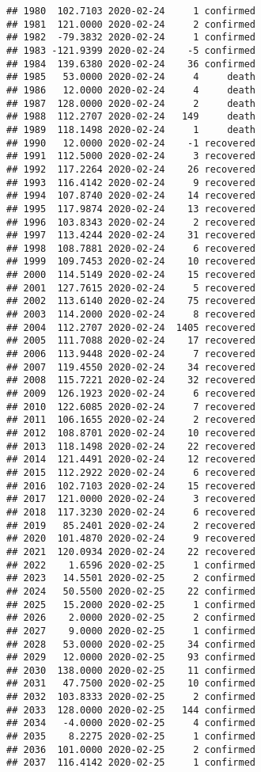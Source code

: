\documentclass[
]{article}
\begin{document}
\begin{verbatim}
## 1980  102.7103 2020-02-24     1 confirmed
## 1981  121.0000 2020-02-24     2 confirmed
## 1982  -79.3832 2020-02-24     1 confirmed
## 1983 -121.9399 2020-02-24    -5 confirmed
## 1984  139.6380 2020-02-24    36 confirmed
## 1985   53.0000 2020-02-24     4     death
## 1986   12.0000 2020-02-24     4     death
## 1987  128.0000 2020-02-24     2     death
## 1988  112.2707 2020-02-24   149     death
## 1989  118.1498 2020-02-24     1     death
## 1990   12.0000 2020-02-24    -1 recovered
## 1991  112.5000 2020-02-24     3 recovered
## 1992  117.2264 2020-02-24    26 recovered
## 1993  116.4142 2020-02-24     9 recovered
## 1994  107.8740 2020-02-24    14 recovered
## 1995  117.9874 2020-02-24    13 recovered
## 1996  103.8343 2020-02-24     2 recovered
## 1997  113.4244 2020-02-24    31 recovered
## 1998  108.7881 2020-02-24     6 recovered
## 1999  109.7453 2020-02-24    10 recovered
## 2000  114.5149 2020-02-24    15 recovered
## 2001  127.7615 2020-02-24     5 recovered
## 2002  113.6140 2020-02-24    75 recovered
## 2003  114.2000 2020-02-24     8 recovered
## 2004  112.2707 2020-02-24  1405 recovered
## 2005  111.7088 2020-02-24    17 recovered
## 2006  113.9448 2020-02-24     7 recovered
## 2007  119.4550 2020-02-24    34 recovered
## 2008  115.7221 2020-02-24    32 recovered
## 2009  126.1923 2020-02-24     6 recovered
## 2010  122.6085 2020-02-24     7 recovered
## 2011  106.1655 2020-02-24     2 recovered
## 2012  108.8701 2020-02-24    10 recovered
## 2013  118.1498 2020-02-24    22 recovered
## 2014  121.4491 2020-02-24    12 recovered
## 2015  112.2922 2020-02-24     6 recovered
## 2016  102.7103 2020-02-24    15 recovered
## 2017  121.0000 2020-02-24     3 recovered
## 2018  117.3230 2020-02-24     6 recovered
## 2019   85.2401 2020-02-24     2 recovered
## 2020  101.4870 2020-02-24     9 recovered
## 2021  120.0934 2020-02-24    22 recovered
## 2022    1.6596 2020-02-25     1 confirmed
## 2023   14.5501 2020-02-25     2 confirmed
## 2024   50.5500 2020-02-25    22 confirmed
## 2025   15.2000 2020-02-25     1 confirmed
## 2026    2.0000 2020-02-25     2 confirmed
## 2027    9.0000 2020-02-25     1 confirmed
## 2028   53.0000 2020-02-25    34 confirmed
## 2029   12.0000 2020-02-25    93 confirmed
## 2030  138.0000 2020-02-25    11 confirmed
## 2031   47.7500 2020-02-25    10 confirmed
## 2032  103.8333 2020-02-25     2 confirmed
## 2033  128.0000 2020-02-25   144 confirmed
## 2034   -4.0000 2020-02-25     4 confirmed
## 2035    8.2275 2020-02-25     1 confirmed
## 2036  101.0000 2020-02-25     2 confirmed
## 2037  116.4142 2020-02-25     1 confirmed

\end{verbatim}
\end{document}

